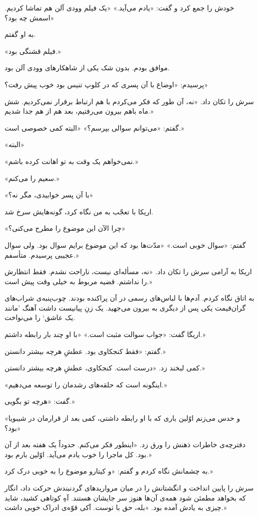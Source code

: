 \documentclass[a5paper]{book}
\begin{document}
خودش را جمع کرد و گفت: «یادم می‌آید.» «یک فیلم وودی آلن هم تماشا کردیم. اسمش چه بود؟»

به او گفتم.

«فیلم قشنگی بود.»

موافق بودم. بدون شک یکی از شاهکارهای وودی آلن بود.

پرسیدم: «اوضاع با آن پسری که در کلوپ تنیس بود خوب پیش رفت؟»

سرش را تکان داد. «نه، آن طور که فکر می‌کردم با هم ارتباط برقرار نمی‌کردیم. شش ماه باهم بیرون می‌رفتیم، بعد هم از هم جدا شدیم.»

گفتم: «می‌توانم سوالی بپرسم؟» «البته کمی خصوصی است.»

«البته»

«نمی‌خواهم یک وقت به تو اهانت کرده باشم.»

«سعیم را می‌کنم.»

«با آن پسر خوابیدی، مگر نه؟»

اریکا با تعجّب به من نگاه کرد، گونه‌هایش سرخ شد.

«چرا الآن این موضوع را مطرح می‌کنی؟»

گفتم: «سوال خوبی است.» «مدّت‌ها بود که این موضوع برایم سوال بود. ولی سوال عجیبی پرسیدم. متأسفم.»

اریکا به آرامی سرش را تکان داد. «نه، مسأله‌ای نیست، ناراحت نشدم. فقط انتظارش را نداشتم. قضیه مربوط به خیلی وقت پیش است.»

به اتاق نگاه کردم. آدم‌ها با لباس‌های رسمی در آن پراکنده بودند. چوب‌پنبه‌ی شراب‌های گرا‌ن‌قیمت یکی پس از دیگری به بیرون می‌جهید. یک زنِ پیانیست داشت آهنگ 'مانند یک عاشق` را می‌نواخت.

اریگا گفت: «جواب سوالت مثبت است.» «با او چند بار رابطه داشتم.»

گفتم: «فقط کنجکاوی بود. عطشِ هرچه بیشتر دانستن.»

کمی لبخند زد. «درست است. کنجکاوی، عطشِ هرچه بیشتر دانستن.»

«اینگونه است که حلقه‌های رشدمان را توسعه می‌دهیم.»

گفت: «هرچه تو بگویی.»

«و حدس می‌زنم اوّلین‌ باری که با او رابطه داشتی، کمی بعد از قرارمان در شیبویا بود؟»

دفترچه‌ی خاطرات ذهنش را ورق زد. «اینطور فکر می‌کنم. حدوداً یک هفته بعد از آن بود. کل ماجرا را خوب یادم می‌آید. اوّلین بارم بود.»

به چشمانش نگاه کردم و گفتم: «و کیتارو موضوع را به خوبی درک کرد.»

سرش را پایین انداخت و انگشتانش را در میان مروارید‌های گردنبندش حرکت داد، انگار که بخواهد مطمئن شود همه‌ی آن‌ها هنوز سر جایشان هستند. آهِ کوتاهی کشید، شاید چیزی به یادش آمده بود. «بله، حق با توست. آکی قوّه‌ی ادراک خوبی داشت.»
\end{document}
